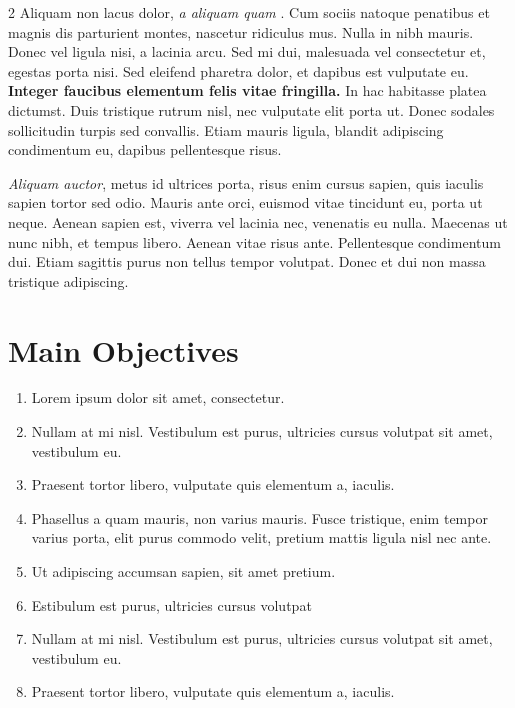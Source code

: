 \documentclass{article}
\begin{document}
\begin{multicols}{2}
Aliquam non lacus dolor, \textit{a aliquam quam} \cite{Smith:2012qr}. Cum sociis natoque penatibus et magnis dis parturient montes, nascetur ridiculus mus. Nulla in nibh mauris. Donec vel ligula nisi, a lacinia arcu. Sed mi dui, malesuada vel consectetur et, egestas porta nisi. Sed eleifend pharetra dolor, et dapibus est vulputate eu. \textbf{Integer faucibus elementum felis vitae fringilla.} In hac habitasse platea dictumst. Duis tristique rutrum nisl, nec vulputate elit porta ut. Donec sodales sollicitudin turpis sed convallis. Etiam mauris ligula, blandit adipiscing condimentum eu, dapibus pellentesque risus.

\textit{Aliquam auctor}, metus id ultrices porta, risus enim cursus sapien, quis iaculis sapien tortor sed odio. Mauris ante orci, euismod vitae tincidunt eu, porta ut neque. Aenean sapien est, viverra vel lacinia nec, venenatis eu nulla. Maecenas ut nunc nibh, et tempus libero. Aenean vitae risus ante. Pellentesque condimentum dui. Etiam sagittis purus non tellus tempor volutpat. Donec et dui non massa tristique adipiscing.


\color{Black} %

\section*{Main Objectives}

\begin{enumerate}
\item Lorem ipsum dolor sit amet, consectetur.
\item Nullam at mi nisl. Vestibulum est purus, ultricies cursus volutpat sit amet, vestibulum eu.
\item Praesent tortor libero, vulputate quis elementum a, iaculis.
\item Phasellus a quam mauris, non varius mauris. Fusce tristique, enim tempor varius porta, elit purus commodo velit, pretium mattis ligula nisl nec ante.
\item Ut adipiscing accumsan sapien, sit amet pretium.
\item Estibulum est purus, ultricies cursus volutpat
\item Nullam at mi nisl. Vestibulum est purus, ultricies cursus volutpat sit amet, vestibulum eu.
\item Praesent tortor libero, vulputate quis elementum a, iaculis.
\end{enumerate}


\end{multicols}
\end{document}
